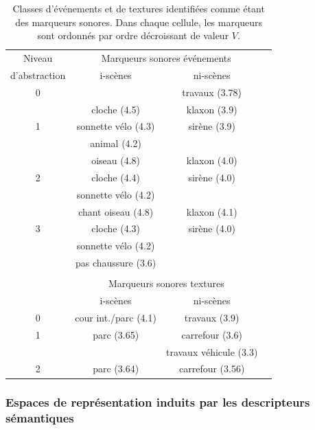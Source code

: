 \documentclass[twoside,twocolumn]{article}
\begin{document}
\begin{table}[t]
 \setlength{\tabcolsep}{0.2pt}
 \centering
  {\renewcommand{\arraystretch}{0.9}
\begin{tabular}{c c c c}
Niveau        & \multicolumn{2}{c}{Marqueurs sonores événements} \\
d'abstraction & i-scènes & ni-scènes \\
\hline
0  &                          & travaux (3.78)  \\
\hline
  & cloche  (4.5)             & klaxon  (3.9) \\
1 & sonnette vélo  (4.3)      & sirène (3.9)\\
  & animal (4.2)              &       \\
   \hline
  & oiseau        (4.8)       & klaxon  (4.0)\\
2 & cloche  (4.4)             & sirène (4.0)\\
  & sonnette vélo    (4.2)             &       \\
   \hline
  & chant oiseau (4.8)        & klaxon  (4.1)\\
3 & cloche   (4.3)            & sirène (4.0)\\
  & sonnette vélo     (4.2)   &       \\
  & pas chaussure  (3.6)      &  \\
  &                           & \\
  & \multicolumn{2}{c}{Marqueurs sonores textures}      \\
  & i-scènes & ni-scènes \\
\hline
0 &     cour int./parc (4.1) &  travaux (3.9)  \\
\hline
1 &     parc (3.65)          &  carrefour (3.6)  \\
  &                          &  travaux véhicule (3.3)  \\
\hline
2 &     parc (3.64)          &  carrefour (3.56)  \\
\hline
\end{tabular}
}
\vspace{0.5mm}
\caption{Classes d'événements et de textures identifiées comme étant des marqueurs sonores. Dans chaque cellule, les marqueurs sont ordonnés par ordre décroissant de valeur $V$.}
\label{tab:markers}
\end{table}

\subsubsection*{Espaces de représentation induits par les descripteurs sémantiques}
\end{document}
